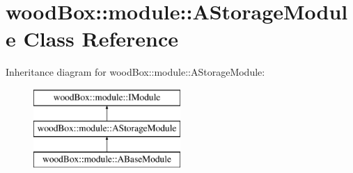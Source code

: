 \hypertarget{classwood_box_1_1module_1_1_a_storage_module}{}\section{wood\+Box\+:\+:module\+:\+:A\+Storage\+Module Class Reference}
\label{classwood_box_1_1module_1_1_a_storage_module}
Inheritance diagram for wood\+Box\+:\+:module\+:\+:A\+Storage\+Module\+:\begin{figure}[H]
\begin{center}
\leavevmode
\includegraphics[height=3.000000cm]{classwood_box_1_1module_1_1_a_storage_module}
\end{center}
\end{figure}
